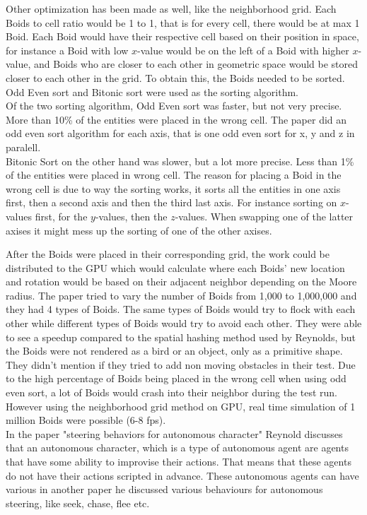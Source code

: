 Other optimization has been made as well, like the neighborhood grid.
Each Boids to cell ratio would be 1 to 1, that is for every cell, there would be at max 1 Boid. Each Boid would have their respective cell based on their position in space, for instance a Boid with low $x$-value would be on the left of a Boid with higher $x$-value, and Boids who are closer to each other in geometric space would be stored closer to each other in the grid. To obtain this, the Boids needed to be sorted. Odd Even sort and Bitonic sort were used as the sorting algorithm.\\
Of the two sorting algorithm, Odd Even sort was faster, but not very precise. More than 10\% of the entities were placed in the wrong cell. The paper did an odd even sort algorithm for each axis, that is one odd even sort for x, y and z in paralell.\\
Bitonic Sort on the other hand was slower, but a lot more precise. Less than 1\% of the entities were placed in wrong cell. The reason for placing a Boid in the wrong cell is due to way the sorting works, it sorts all the entities in one axis first, then a second axis and then the third last axis. For instance sorting on $x$-values first, for the $y$-values, then the $z$-values. When swapping one of the latter axises it might mess up the sorting of one of the other axises.

After the Boids were placed in their corresponding grid, the work could be distributed to the GPU which would calculate where each Boids' new location and rotation would be based on their adjacent neighbor depending on the Moore radius.
The paper tried to vary the number of Boids from 1,000 to 1,000,000 and they had 4 types of Boids. The same types of Boids would try to flock with each other while different types of Boids would try to avoid each other.
They were able to see a speedup compared to the spatial hashing method used by Reynolds, but the Boids were not rendered as a bird or an object, only as a primitive shape. They didn't mention if they tried to add non moving obstacles in their test. Due to the high percentage of Boids being placed in the wrong cell when using odd even sort, a lot of Boids would crash into their neighbor during the test run. However using the neighborhood grid method on GPU, real time simulation of 1 million Boids were possible (6-8 fps).\\

In the paper "steering behaviors for autonomous character" Reynold discusses that an autonomous character, which is a type of autonomous agent are agents that have some ability to improvise their actions. That means that these agents do not have their actions scripted in advance.
These autonomous agents can have various 
in another paper he discussed various behaviours for autonomous steering, like seek, chase, flee etc.




